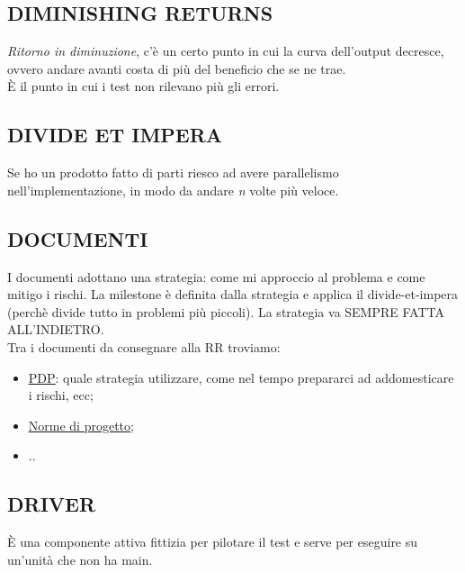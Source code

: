 		\subsection{DIMINISHING RETURNS}		\label{diminishingreturn}	%
		\textit{Ritorno in diminuzione}, c'è un certo punto in cui la curva dell'output decresce, ovvero andare avanti costa di più del beneficio che se ne trae. \\
		È il punto in cui i test non rilevano più gli errori.
		
		\subsection{DIVIDE ET IMPERA}	 \label{divideetimpera}		
		Se ho un prodotto fatto di parti riesco ad avere parallelismo nell'implementazione, in modo da andare \textit{n} volte più veloce.
		
		\subsection{DOCUMENTI}		\label{documenti}	%
		I documenti adottano una strategia: come mi approccio al problema e come mitigo i rischi. La milestone è definita dalla strategia e applica il divide-et-impera (perchè divide tutto in problemi più piccoli). La strategia va SEMPRE FATTA ALL'INDIETRO. \\
		Tra i documenti da consegnare alla RR troviamo:
		\begin{itemize}
			\item \underline{\hyperref[piano]{PDP}}: quale strategia utilizzare, come nel tempo prepararci ad addomesticare i rischi, ecc;
			\item \underline{\hyperref[norme]{Norme di progetto}};
			\item ..
		\end{itemize} 
	
		\subsection{DRIVER}		\label{driver}
		È una componente attiva fittizia per pilotare il test e serve per eseguire su un'unità che non ha main.
	
